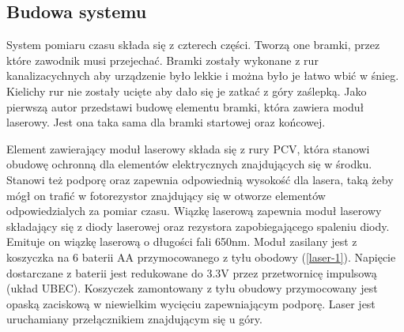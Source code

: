 \documentclass[11pt,a4paper, twoside]{article}
\begin{document}
\subsection{Budowa systemu}
System pomiaru czasu składa się z czterech części. Tworzą one bramki, przez które zawodnik musi przejechać. Bramki zostały wykonane z rur kanalizacychnych aby urządzenie było lekkie i można było je łatwo wbić w śnieg. Kielichy rur nie zostały ucięte aby dało się je zatkać z góry zaślepką. Jako pierwszą autor przedstawi budowę elementu bramki, która zawiera moduł laserowy. Jest ona taka sama dla bramki startowej oraz końcowej.

Element zawierający moduł laserowy składa się z rury PCV, która stanowi obudowę ochronną dla elementów elektrycznych znajdujących się w środku. Stanowi też podporę oraz zapewnia odpowiednią wysokość dla lasera, taką żeby mógł on trafić w fotorezystor znajdujący się w otworze elementów odpowiedzialych za pomiar czasu. Wiązkę laserową zapewnia moduł laserowy składający się z diody laserowej oraz rezystora zapobiegającego spaleniu diody. Emituje on wiązkę laserową o długości fali 650nm. Moduł zasilany jest z koszyczka na 6 baterii AA przymocowanego z tyłu obodowy (\ref{laser-1}). Napięcie dostarczane z baterii jest redukowane do 3.3V przez przetwornicę impulsową (układ UBEC). Koszyczek zamontowany z tyłu obudowy przymocowany jest opaską zaciskową w niewielkim wycięciu zapewniającym podporę. Laser jest uruchamiany przełącznikiem znajdującym się u góry. 
\end{document}
